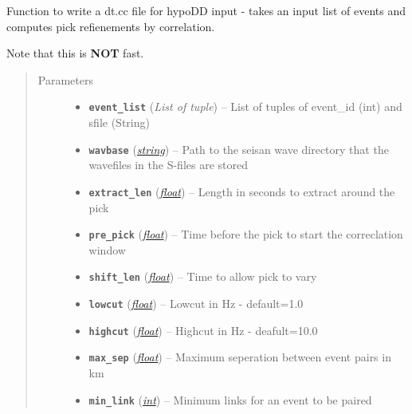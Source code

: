 \documentclass[a4paper,10pt,english]{sphinxmanual}
\begin{document}
\begin{fulllineitems}
\label{utils:catalogue2DD.write_correlations}
Function to write a dt.cc file for hypoDD input - takes an input list of
events and computes pick refienements by correlation.

Note that this is \textbf{NOT} fast.
\begin{quote}\begin{description}
\item[{Parameters}] \leavevmode\begin{itemize}
\item {} 
\textbf{\texttt{event\_list}} (\emph{List of tuple}) -- List of tuples of event\_id (int) and sfile (String)

\item {} 
\textbf{\texttt{wavbase}} (\href{https://docs.python.org/library/string.html\#module-string}{\emph{string}}) -- Path to the seisan wave directory that the wavefiles in the
S-files are stored

\item {} 
\textbf{\texttt{extract\_len}} (\href{https://docs.python.org/library/functions.html\#float}{\emph{float}}) -- Length in seconds to extract around the pick

\item {} 
\textbf{\texttt{pre\_pick}} (\href{https://docs.python.org/library/functions.html\#float}{\emph{float}}) -- Time before the pick to start the correclation window

\item {} 
\textbf{\texttt{shift\_len}} (\href{https://docs.python.org/library/functions.html\#float}{\emph{float}}) -- Time to allow pick to vary

\item {} 
\textbf{\texttt{lowcut}} (\href{https://docs.python.org/library/functions.html\#float}{\emph{float}}) -- Lowcut in Hz - default=1.0

\item {} 
\textbf{\texttt{highcut}} (\href{https://docs.python.org/library/functions.html\#float}{\emph{float}}) -- Highcut in Hz - deafult=10.0

\item {} 
\textbf{\texttt{max\_sep}} (\href{https://docs.python.org/library/functions.html\#float}{\emph{float}}) -- Maximum seperation between event pairs in km

\item {} 
\textbf{\texttt{min\_link}} (\href{https://docs.python.org/library/functions.html\#int}{\emph{int}}) -- Minimum links for an event to be paired

\end{itemize}

\end{description}\end{quote}

\end{fulllineitems}
\end{document}
